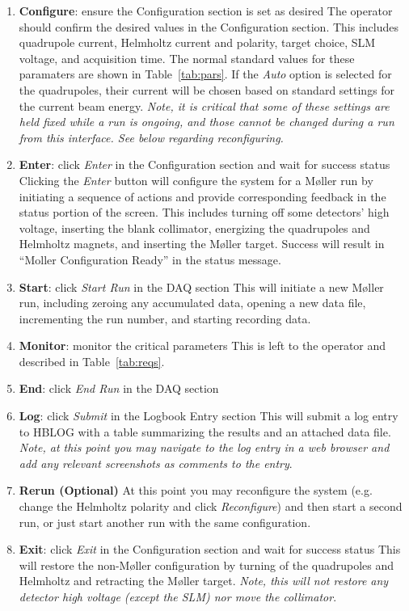 \documentclass[amsmath,amssymb,notitlepage,12pt]{revtex4}
\begin{document}
\begin{enumerate}
\item {\bf Configure}:  ensure the Configuration section is set as desired
        \subitem
        The operator should confirm the desired values in the Configuration section.  This includes quadrupole current, Helmholtz current and polarity, target choice, SLM voltage, and acquisition time.  The normal standard values for these paramaters are shown in Table~\ref{tab:pars}. If the {\em Auto} option is selected for the quadrupoles, their current will be chosen based on standard settings for the current beam energy.  {\em Note, it is critical that some of these settings are held fixed while a run is ongoing, and those cannot be changed during a run from this interface.  See below regarding reconfiguring.}
\item {\bf Enter}: click {\em Enter} in the Configuration section and wait for success status
    \subitem Clicking the {\em Enter} button will configure the system for a M{\o}ller run by initiating a sequence of actions and provide corresponding feedback in the status portion of the screen.  This includes turning off some detectors' high voltage, inserting the blank collimator, energizing the quadrupoles and Helmholtz magnets, and inserting the M{\o}ller target.  Success will result in ``Moller Configuration Ready'' in the status message.
\item {\bf Start}: click {\em Start Run} in the DAQ section
    \subitem This will initiate a new M{\o}ller run, including zeroing any accumulated data, opening a new data file, incrementing the run number, and starting recording data.
\item {\bf Monitor}: monitor the critical parameters
    \subitem This is left to the operator and described in Table~\ref{tab:reqs}.
\item {\bf End}: click {\em End Run} in the DAQ section
\item {\bf Log}: click {\em Submit} in the Logbook Entry section 
    \subitem This will submit a log entry to HBLOG with a table summarizing the results and an attached data file. {\em Note, at this point you may navigate to the log entry in a web browser and add any relevant screenshots as comments to the entry}.
\item {\bf Rerun (Optional)}  At this point you may reconfigure the system (e.g. change the Helmholtz polarity and click {\em Reconfigure}) and then start a second run, or just start another run with the same configuration.
\item {\bf Exit}: click {\em Exit} in the Configuration section and wait for success status
    \subitem  This will restore the non-M{\o}ller configuration by turning of the quadrupoles and Helmholtz and retracting the M{\o}ller target.  {\em Note, this will not restore any detector high voltage (except the SLM) nor move the collimator}. 
\end{enumerate}
\end{document}
